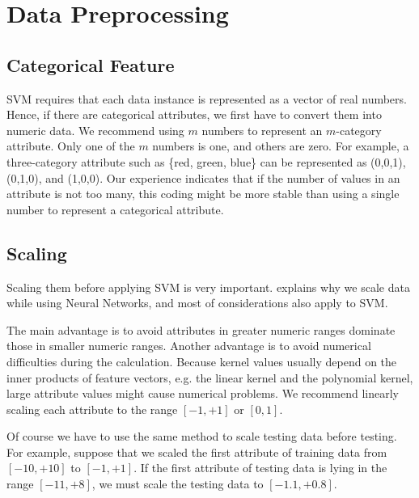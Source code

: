 \documentclass[12pt]{article}
\begin{document}

\section{Data Preprocessing}

\subsection{Categorical Feature}

SVM requires that each data instance is represented
as a vector of real numbers. Hence, if there are 
categorical attributes, we first have to convert 
them into numeric data. We recommend using $m$ numbers to 
represent an $m$-category attribute. Only one of the $m$
numbers is one, and others are zero. For example,
a three-category attribute such as \{red, green, blue\}
can be represented as (0,0,1),
(0,1,0), and (1,0,0). Our experience indicates that if
the number of values in an attribute is not too many, 
this coding might be more stable 
than using a single number to represent a 
categorical attribute. 

\subsection{Scaling}
\label{scaling}

Scaling them before applying SVM is very important.
\href{ftp://ftp.sas.com/pub/neural/FAQ.html}
{\cite[Part 2 of Neural Networks FAQ]{NN01a}} explains why we scale 
data while using Neural Networks, and most 
of considerations also apply to SVM. 

The main advantage is to avoid attributes in 
greater numeric ranges dominate those in 
smaller numeric ranges. Another advantage is to 
avoid numerical difficulties during the calculation. 
Because kernel values usually depend on the
inner products of feature vectors, e.g. the linear
kernel and the polynomial kernel, large attribute
values might cause numerical problems.
We recommend linearly scaling each attribute to 
the range $[-1,+1]$ or $[0,1]$.

Of course we have to use the same method to 
scale testing data before testing. For example, 
suppose that we scaled the first attribute 
of training data from $[-10, +10]$ to $[-1, +1]$. 
If the first attribute of testing
data is lying in the range $[-11, +8]$, we must 
scale the testing data to $[-1.1, +0.8]$.
\end{document}
